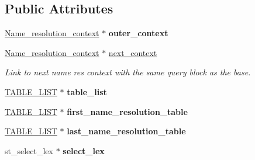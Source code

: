 \subsection*{Public Attributes}
\begin{DoxyCompactItemize}
\item 
\mbox{\label{structName__resolution__context_a6c220c586bc09e771377064f7616c0f0}} 
\mbox{\hyperlink{structName__resolution__context}{Name\+\_\+resolution\+\_\+context}} $\ast$ {\bfseries outer\+\_\+context}
\item 
\mbox{\label{structName__resolution__context_a2adf4421f803e8ae5c8e7c90d6057d04}} 
\mbox{\hyperlink{structName__resolution__context}{Name\+\_\+resolution\+\_\+context}} $\ast$ \mbox{\hyperlink{structName__resolution__context_a2adf4421f803e8ae5c8e7c90d6057d04}{next\+\_\+context}}
\begin{DoxyCompactList}\small\item\em Link to next name res context with the same query block as the base. \end{DoxyCompactList}\item 
\mbox{\label{structName__resolution__context_a9361173ca0a970d506704bb3af11ed66}} 
\mbox{\hyperlink{structTABLE__LIST}{T\+A\+B\+L\+E\+\_\+\+L\+I\+ST}} $\ast$ {\bfseries table\+\_\+list}
\item 
\mbox{\label{structName__resolution__context_a8b979d23ddc45b2018b94af78b4420b0}} 
\mbox{\hyperlink{structTABLE__LIST}{T\+A\+B\+L\+E\+\_\+\+L\+I\+ST}} $\ast$ {\bfseries first\+\_\+name\+\_\+resolution\+\_\+table}
\item 
\mbox{\label{structName__resolution__context_adc2282fa36691d1d6664dbdae78a8975}} 
\mbox{\hyperlink{structTABLE__LIST}{T\+A\+B\+L\+E\+\_\+\+L\+I\+ST}} $\ast$ {\bfseries last\+\_\+name\+\_\+resolution\+\_\+table}
\item 
\mbox{\label{structName__resolution__context_a7b3bf854e0c7beeb25132a829343258b}} 
st\+\_\+select\+\_\+lex $\ast$ {\bfseries select\+\_\+lex}
\item 
\mbox{\label{structName__resolution__context_aa7cb67dc227484ac4c1d2fd505dd9e40}} 

\end{DoxyCompactItemize}
